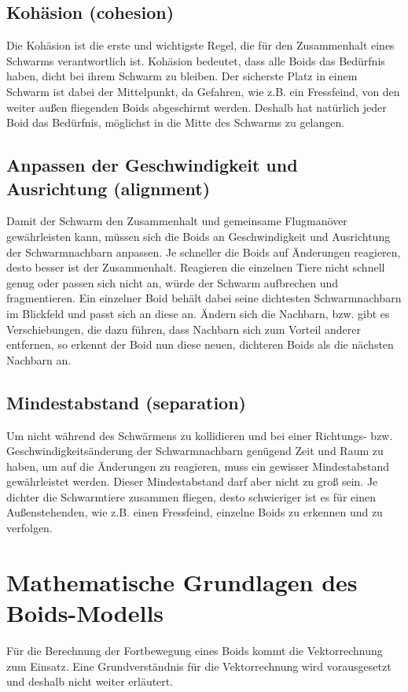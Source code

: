 \documentclass[draft=false
              ,paper=a4
              ,twoside=false
              ,fontsize=11pt
              ,headsepline
              ,BCOR10mm
              ,DIV11
              ,bibtotoc
              ,liststotoc
              ]{scrbook}
\begin{document}
\subsection{Kohäsion (cohesion)}
Die Kohäsion ist die erste und wichtigste Regel, die für den Zusammenhalt eines Schwarms verantwortlich ist. Kohäsion bedeutet, dass alle Boids das Bedürfnis haben, dicht bei ihrem Schwarm zu bleiben. Der sicherste Platz in einem Schwarm ist dabei der Mittelpunkt, da Gefahren, wie z.B. ein Fressfeind, von den weiter außen fliegenden Boids abgeschirmt werden. Deshalb hat natürlich jeder Boid das Bedürfnis, möglichst in die Mitte des Schwarms zu gelangen.
\subsection{Anpassen der Geschwindigkeit und Ausrichtung (alignment)}
Damit der Schwarm den Zusammenhalt und gemeinsame Flugmanöver gewährleisten kann, müssen sich die Boids an Geschwindigkeit und Ausrichtung der Schwarmnachbarn anpassen. Je schneller die Boids auf Änderungen reagieren, desto besser ist der Zusammenhalt. Reagieren die einzelnen Tiere nicht schnell genug oder passen sich nicht an, würde der Schwarm aufbrechen und fragmentieren. Ein einzelner Boid behält dabei seine dichtesten Schwarmnachbarn im Blickfeld und passt sich an diese an. Ändern sich die Nachbarn, bzw. gibt es Verschiebungen, die dazu führen, dass Nachbarn sich zum Vorteil anderer entfernen, so erkennt der Boid nun diese neuen, dichteren Boids als die nächsten Nachbarn an.
\subsection{Mindestabstand (separation)}
Um nicht während des Schwärmens zu kollidieren und bei einer Richtungs- bzw. Geschwindigkeitsänderung der Schwarmnachbarn genügend Zeit und Raum zu haben, um auf die Änderungen zu reagieren, muss ein gewisser Mindestabstand gewährleistet werden. Dieser Mindestabstand darf aber nicht zu groß sein. Je dichter die Schwarmtiere zusammen fliegen, desto schwieriger ist es für einen Außenstehenden, wie z.B. einen Fressfeind, einzelne Boids zu erkennen und zu verfolgen.

\section{Mathematische Grundlagen des Boids-Modells}\label{mathe}
Für die Berechnung der Fortbewegung eines Boids kommt die Vektorrechnung zum Einsatz. Eine Grundverständnis für die Vektorrechnung wird vorausgesetzt und deshalb nicht weiter erläutert.
\end{document}
